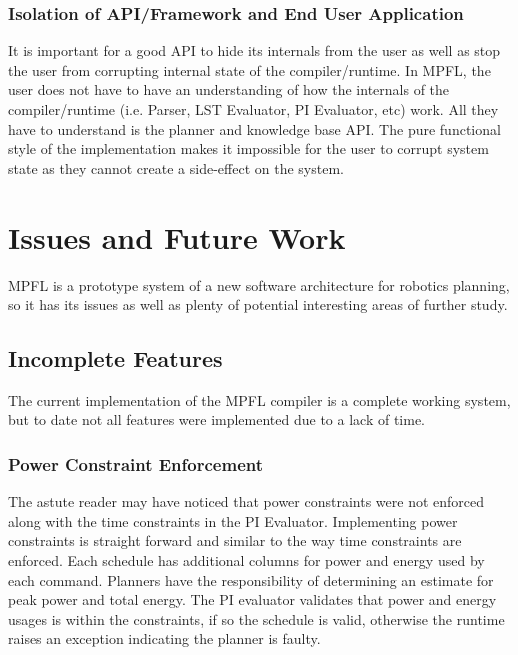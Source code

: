 \subsubsection{Isolation of API/Framework and End User Application}
It is important for a good API to hide its internals from the user as well as stop the user from corrupting internal state of the compiler/runtime. In MPFL, the user does not have to have an understanding of how the internals of the compiler/runtime (i.e. Parser, LST Evaluator, PI Evaluator, etc) work. All they have to understand is the planner and knowledge base API. The pure functional style of the implementation makes it impossible for the user to corrupt system state as they cannot create a side-effect on the system.

\section{Issues and Future Work}
MPFL is a prototype system of a new software architecture for robotics planning, so it has its issues as well as plenty of potential interesting areas of further study.

\subsection{Incomplete Features}
The current implementation of the MPFL compiler is a complete working system, but to date not all features were implemented due to a lack of time. 

\subsubsection{Power Constraint Enforcement}
The astute reader may have noticed that power constraints were not enforced along with the time constraints in the PI Evaluator. Implementing power constraints is straight forward and similar to the way time constraints are enforced. Each schedule has additional columns for power and energy used by each command. Planners have the responsibility of determining an estimate for peak power and total energy. The PI evaluator validates that power and energy usages is within the constraints, if so the schedule is valid, otherwise the runtime raises an exception indicating the planner is faulty.

